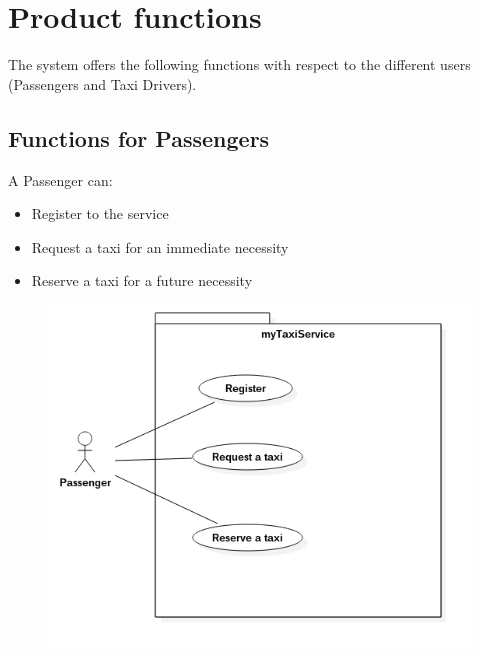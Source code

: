 \section{Product functions}
The system offers the following functions with respect to the different users (Passengers and Taxi Drivers).
\subsection{Functions for Passengers}
A Passenger can:
\begin{itemize}
\item Register to the service
\item Request a taxi for an immediate necessity
\item Reserve a taxi for a future necessity
\end{itemize}
\begin{figure}[H]
\centering
\includegraphics[scale=0.5]{Images/uc_highLevel_passenger}
\end{figure}

